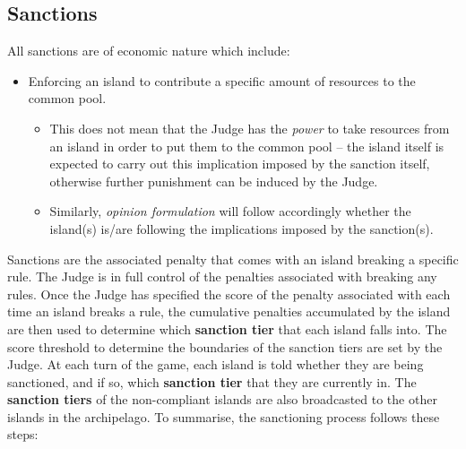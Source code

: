 \subsection{Sanctions}
\label{sec:sanctions}
All sanctions are of economic nature which include:
        \begin{itemize}
            \item Enforcing an island to contribute a specific amount of resources to the common pool.
            \begin{itemize}
                \item This does not mean that the Judge has the \emph{power} to take resources from an island in order to put them to the common pool -- the island itself is expected to carry out this implication imposed by the sanction itself, otherwise further punishment can be induced by the Judge.
                \item Similarly, \emph{opinion formulation} will follow accordingly whether the island(s) is/are following the implications imposed by the sanction(s).
            \end{itemize}
        
    \end{itemize}
    Sanctions are the associated penalty that comes with an island breaking a specific rule. The Judge is in full control of the penalties associated with breaking any rules. Once the Judge has specified the score of the penalty associated with each time an island breaks a rule, the cumulative penalties accumulated by the island are then used to determine which \textbf{sanction tier} that each island falls into. The score threshold to determine the boundaries of the sanction tiers are set by the Judge. At each turn of the game, each island is told whether they are being sanctioned, and if so, which \textbf{sanction tier} that they are currently in. The \textbf{sanction tiers} of the non-compliant islands are also broadcasted to the other islands in the archipelago. To summarise, the sanctioning process follows these steps:
    
    
    
    
